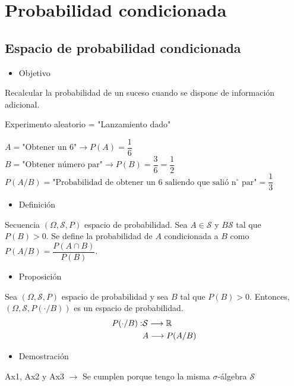 \section{Probabilidad condicionada}
\subsection{Espacio de probabilidad condicionada}
\begin{itemize}[label=\color{red}\textbullet, leftmargin=*]
	\item \color{lightblue}Objetivo
\end{itemize}
Recalcular la probabilidad de un suceso cuando se dispone de información adicional.

\Ej

Experimento aleatorio = "Lanzamiento dado"

$A=\text{"Obtener un 6"}\longrightarrow P(A)=\dfrac{1}{6}$\\
$B=\text{"Obtener número par"}\longrightarrow P(B)=\dfrac{3}{6}=\dfrac{1}{2}$\\
$P(A/B)=\text{"Probabilidad de obtener un 6 saliendo que salió n$^\circ$ par"}=\dfrac{1}{3}$
\begin{itemize}[label=\color{red}\textbullet, leftmargin=*]
	\item \color{lightblue}Definición
\end{itemize}
Secuencia $(\Omega,\mathcal{S},P)$ espacio de probabilidad. Sea $A\in\mathcal{S}$ y $B\mathcal{S}$ tal que $P(B)>0$. Se define la probabilidad de $A$ condicionada a $B$ como $P(A/B)=\dfrac{P(A\cap B)}{P(B)}$.

\begin{itemize}[label=\color{red}\textbullet, leftmargin=*]
	\item \color{lightblue}Proposición
\end{itemize}
Sea $(\Omega,\mathcal{S},P)$ espacio de probabilidad y sea $B$ tal que $P(B)>0$. Entonces, $(\Omega,\mathcal{S},P(\cdot/B))$ es un espacio de probabilidad.\[ \begin{aligned}
	P(\cdot/B):&\mathcal{S}\longrightarrow\operatorname{\mathbb{R}}\\
	&A\longrightarrow P(A/B)
\end{aligned} \]
\begin{itemize}[label=\color{red}\textbullet, leftmargin=*]
	\item \color{lightblue}Demostración
\end{itemize}
Ax1,  Ax2 y Ax3 $\longrightarrow$ Se cumplen porque tengo la misma $\sigma$-álgebra $\mathcal{S}$

